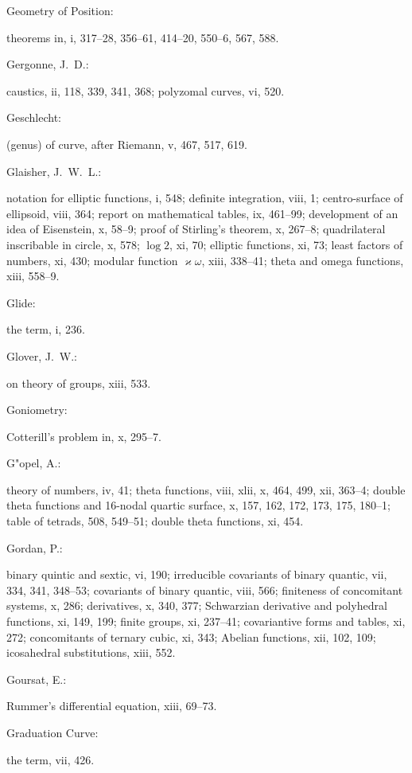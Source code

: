 \documentclass[11pt,a4paper]{book}
\providecommand{\V}[1]{#1}
\providecommand{\IndexEntry}[2]{#1\dotfill #2\par}
\begin{document}
\IndexEntry{Geometry of Position}: theorems in, \V{i}, 317--28, 356--61, 414--20, 550--6, 567, 588.

\IndexEntry{Gergonne, J.\ D.}: caustics, \V{ii}, 118, 339, 341, 368; polyzomal curves, \V{vi}, 520.

\IndexEntry{Geschlecht}: (genus) of curve, after Riemann, \V{v}, 467, 517, 619.

\IndexEntry{Glaisher, J.\ W.\ L.}: notation for elliptic functions, \V{i}, 548; definite integration, \V{viii}, 1; centro-surface of ellipsoid, \V{viii}, 364; report on mathematical tables, \V{ix}, 461--99; development of an idea of Eisenstein, \V{x}, 58--9; proof of Stirling's theorem, \V{x}, 267--8; quadrilateral inscribable in circle, \V{x}, 578; $\log 2$, \V{xi}, 70; elliptic functions, \V{xi}, 73; least factors of numbers, \V{xi}, 430; modular function $\varkappa\omega$, \V{xiii}, 338--41; theta and omega functions, \V{xiii}, 558--9.

\IndexEntry{Glide}: the term, \V{i}, 236.

\IndexEntry{Glover, J.\ W.}: on theory of groups, \V{xiii}, 533.

\IndexEntry{Goniometry}: Cotterill's problem in, \V{x}, 295--7.

\IndexEntry{G"opel, A.}: theory of numbers, \V{iv}, 41; theta functions, \V{viii}, xlii, \V{x}, 464, 499, \V{xii}, 363--4; double theta functions and 16-nodal quartic surface, \V{x}, 157, 162, 172, 173, 175, 180--1; table of tetrads, 508, 549--51; double theta functions, \V{xi}, 454.

\IndexEntry{Gordan, P.}: binary quintic and sextic, \V{vi}, 190; irreducible covariants of binary quantic, \V{vii}, 334, 341, 348--53; covariants of binary quantic, \V{viii}, 566; finiteness of concomitant systems, \V{x}, 286; derivatives, \V{x}, 340, 377; Schwarzian derivative and polyhedral functions, \V{xi}, 149, 199; finite groups, \V{xi}, 237--41; covariantive forms and tables, \V{xi}, 272; concomitants of ternary cubic, \V{xi}, 343; Abelian functions, \V{xii}, 102, 109; icosahedral substitutions, \V{xiii}, 552.

\newpage

\setcounter{page}{101}

\IndexEntry{Goursat, E.}: Rummer's differential equation, \V{xiii}, 69--73.

\IndexEntry{Graduation Curve}: the term, \V{vii}, 426.
\end{document}
